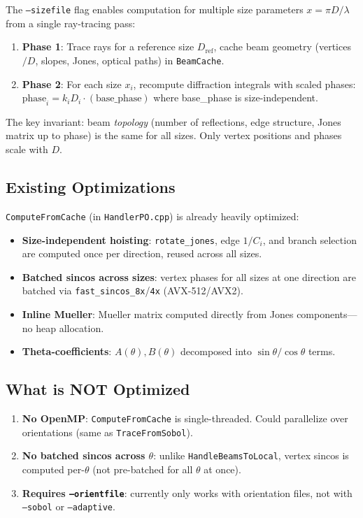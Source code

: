 \documentclass[11pt,a4paper]{article}
\begin{document}
The \texttt{--sizefile} flag enables computation for multiple size parameters $x = \pi D/\lambda$
from a single ray-tracing pass:

\begin{enumerate}
\item \textbf{Phase 1}: Trace rays for a reference size $D_\text{ref}$, cache beam geometry
  (vertices$/D$, slopes, Jones, optical paths) in \texttt{BeamCache}.
\item \textbf{Phase 2}: For each size $x_i$, recompute diffraction integrals with scaled phases:
  $\text{phase}_i = k_i D_i \cdot (\text{base\_phase})$ where base\_phase is size-independent.
\end{enumerate}

The key invariant: beam \emph{topology} (number of reflections, edge structure, Jones matrix
up to phase) is the same for all sizes. Only vertex positions and phases scale with $D$.

\subsection{Existing Optimizations}

\texttt{ComputeFromCache} (in \texttt{HandlerPO.cpp}) is already heavily optimized:

\begin{itemize}
\item \textbf{Size-independent hoisting}: \texttt{rotate\_jones}, edge $1/C_i$, and branch selection
  are computed once per direction, reused across all sizes.
\item \textbf{Batched sincos across sizes}: vertex phases for all sizes at one direction are
  batched via \texttt{fast\_sincos\_8x}/\texttt{4x} (AVX-512/AVX2).
\item \textbf{Inline Mueller}: Mueller matrix computed directly from Jones components—no heap allocation.
\item \textbf{Theta-coefficients}: $A(\theta), B(\theta)$ decomposed into $\sin\theta/\cos\theta$ terms.
\end{itemize}

\subsection{What is NOT Optimized}

\begin{enumerate}
\item \textbf{No OpenMP}: \texttt{ComputeFromCache} is single-threaded. Could parallelize over
  orientations (same as \texttt{TraceFromSobol}).
\item \textbf{No batched sincos across $\theta$}: unlike \texttt{HandleBeamsToLocal},
  vertex sincos is computed per-$\theta$ (not pre-batched for all $\theta$ at once).
\item \textbf{Requires \texttt{--orientfile}}: currently only works with orientation files,
  not with \texttt{--sobol} or \texttt{--adaptive}.
\end{enumerate}
\end{document}
